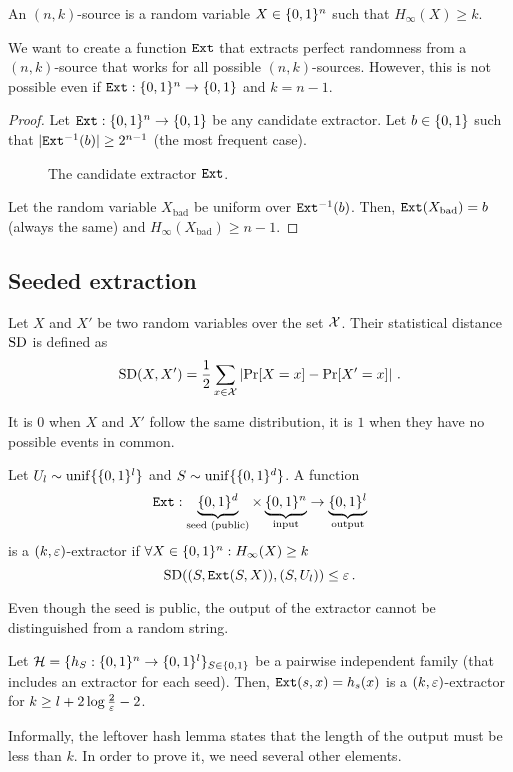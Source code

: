 \begin{definition}
	An $(n,k)$-source is a random variable $X \in \{0, 1\}^n$ such that  $H_{\infty}(X) \geq k$.
\end{definition}

We want to create a function  $\texttt{Ext}$ that extracts perfect randomness from a $(n,k)$-source that works for all possible $(n,k)$-sources.
However, this is not possible even if $\texttt{Ext} : \{0, 1\}^n \to \{0, 1\}$ and $k = n - 1$.
\begin{proof}
	Let $\texttt{Ext} : \{0, 1\}^n \to \{0, 1\}$ be any candidate extractor.
	Let $b \in \{0, 1\}$ such that $|\texttt{Ext}^{-1}(b)| \geq 2^{n-1}$ (the most frequent case).
	
	\begin{figure}[H]
		\centering
		
		\caption{The candidate extractor $\texttt{Ext}$.}
	\end{figure}
	
	
	Let the random variable $X_{\text{bad}}$ be uniform over $\texttt{Ext}^{-1}(b)$.
	Then, $\texttt{Ext}(X_\text{bad}) = b$ (always the same) and $H_{\infty}(X_\text{bad}) \geq n - 1$.
\end{proof}


\subsection{Seeded extraction}
\begin{definition}
	Let $X$ and $X'$ be two random variables over the set $\mathcal{X}$.
	Their statistical distance $\operatorname{SD}$ is defined as
	\[
		\operatorname{SD}(X, X') = \frac{1}{2}\sum_{x \in \mathcal{X} } \left|{\Pr[X=x] - \Pr[X'=x]}\right| \, .
	\]
\end{definition}
%
\noindent It is $0$ when $X$ and $X'$ follow the same distribution, it is $1$ when they have no possible events in common.

\begin{definition}
	Let $U_l \sim \operatorname{unif}\{\{0, 1\}^l\}$ and $S \sim \operatorname{unif}\{\{0, 1\}^d\}$.
	A function
	\[
		\texttt{Ext}: \underbrace{\{0, 1\}^d}_{\text{seed (public})} \times \underbrace{\{0, 1\}^n}_{\text{input}} \to \underbrace{\{0, 1\}^l}_{\text{output}}
	\]
	is a $(k, \varepsilon)$-extractor if $\forall X \in \{0, 1\}^n : H_{\infty}(X) \geq k$
	\[
		\operatorname{SD}((S, \texttt{Ext}(S, X)), (S, U_l)) \leq \varepsilon \, .
	\]
\end{definition}
%
\noindent Even though the seed is public, the output of the extractor cannot be distinguished from a random string.

\begin{lemma}\label{lemma:leftover-hash}
	Let $\mathcal{H} = \{h_S : \{0, 1\}^n \to \{0, 1\}^l\}_{S \in \{0, 1\}}$ be a pairwise independent family (that includes an extractor for each seed).
	Then, $\texttt{Ext}(s, x) = h_s(x)$ is a $(k, \varepsilon)$-extractor for $k \geq l + 2 \log \frac{2}{\varepsilon} -2$.
\end{lemma}
%
\noindent Informally, the leftover hash lemma states that the length of the output must be less than $k$.
In order to prove it, we need several other elements.

